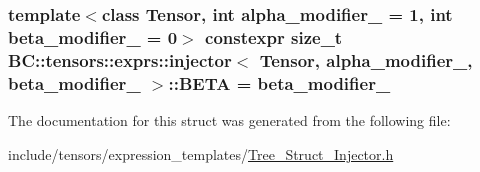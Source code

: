 \subsubsection[{\texorpdfstring{B\+E\+TA}{BETA}}]{\setlength{\rightskip}{0pt plus 5cm}template$<$class Tensor, int alpha\+\_\+modifier\+\_\+ = 1, int beta\+\_\+modifier\+\_\+ = 0$>$ constexpr {\bf size\+\_\+t} {\bf B\+C\+::tensors\+::exprs\+::injector}$<$ {\bf Tensor}, alpha\+\_\+modifier\+\_\+, beta\+\_\+modifier\+\_\+ $>$\+::B\+E\+TA = beta\+\_\+modifier\+\_\+\hspace{0.3cm}{\ttfamily [static]}}\hypertarget{structBC_1_1tensors_1_1exprs_1_1injector_aabb38c0c49d03c65b4925c5f417f88ad}{}\label{structBC_1_1tensors_1_1exprs_1_1injector_aabb38c0c49d03c65b4925c5f417f88ad}


The documentation for this struct was generated from the following file\+:\begin{DoxyCompactItemize}
\item 
include/tensors/expression\+\_\+templates/\hyperlink{Tree__Struct__Injector_8h}{Tree\+\_\+\+Struct\+\_\+\+Injector.\+h}\end{DoxyCompactItemize}
